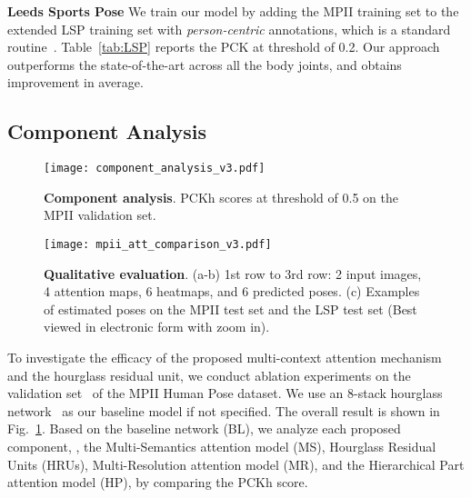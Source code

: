 \documentclass[10pt,twocolumn,letterpaper]{article}
\newcommand{\smalltitle}[1]{\vspace{0.2em}\noindent \textbf{{#1}}}
\begin{document}
\smalltitle{Leeds Sports Pose} 
We train our model by adding the MPII training set to the extended LSP training set with \textit{person-centric} annotations, which is a standard routine~\cite{wei2016convolutional,insafutdinov2016deepercut,pishchulin2016deepcut,lifshitz2016human, belagiannis2016recurrent}. Table~\ref{tab:LSP} reports the PCK at threshold of 0.2. Our approach outperforms the state-of-the-art across all the body joints, and obtains  improvement in average.


\subsection{Component Analysis}


\begin{figure} \begin{center}
    \texttt{[image: component\_analysis\_v3.pdf]}
  \end{center}
    \vspace{-2em}
  \caption{\small \textbf{Component analysis}. PCKh scores at threshold of 0.5 on the MPII validation set. }
    \vspace{-1.5 em}
  \label{fig:component_analysis}
\end{figure}


\begin{figure*} \begin{center}
  \texttt{[image: mpii\_att\_comparison\_v3.pdf]}
\end{center}
\vspace{-1.5em}
   \caption{\small \textbf{Qualitative evaluation}. (a-b) 1st row to 3rd row: 2 input images, 4 attention maps, 6 heatmaps, and 6 predicted poses. (c) Examples of estimated poses on the MPII test set and the LSP test set (Best viewed in electronic form with  zoom in).}
\vspace{-1em}
\label{fig:mpii_att_comparison}
\end{figure*}

To investigate the efficacy of the proposed multi-context attention mechanism and the hourglass residual unit, we conduct ablation experiments on the validation set~\cite{tompson2015efficient} of the MPII Human Pose dataset. We use an 8-stack hourglass network~\cite{newell2016stacked} as our baseline model if not specified. 
The overall result is shown in Fig.~\ref{fig:component_analysis}. 
Based on the baseline network (BL), we analyze each proposed component, \ie, the Multi-Semantics attention model (MS), Hourglass Residual Units (HRUs), Multi-Resolution attention model (MR), and the Hierarchical Part attention model (HP), by comparing the PCKh score. 
\end{document}
